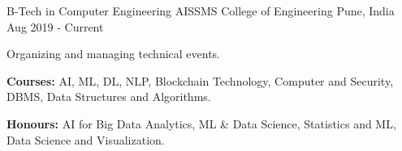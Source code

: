 

\begin{cventries}

  \cventry
    {B-Tech in Computer Engineering} %
    {AISSMS College of Engineering} %
    {Pune, India} %
    {Aug 2019 - Current} %
    {
      \begin{cvitems} %
        \item {Organizing and managing technical events.\hfill{}}
        \item {\textbf{Courses:} AI, ML, DL, NLP, Blockchain Technology, Computer and Security, DBMS, Data Structures and Algorithms.}
        \item {\textbf{Honours:} AI for Big Data Analytics, ML \& Data Science, Statistics and ML, Data Science and Visualization.}
      \end{cvitems}
    }

\end{cventries}
